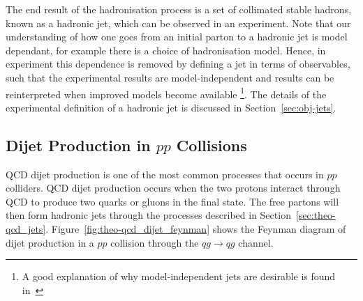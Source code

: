 The end result of the hadronisation process is a set of collimated stable hadrons,
known as a hadronic jet, which can be observed in an experiment.
Note that our understanding of how one goes from an initial parton to a hadronic jet is model dependant,
for example there is a choice of hadronisation model.
Hence, in experiment this dependence is removed by defining a jet in terms of observables,
such that the experimental results are model-independent and results can be reinterpreted when improved models become available
\footnote{A good explanation of why model-independent jets are desirable is found in~\cite{theo-jets_jb}}.
The details of the experimental definition of a hadronic jet is discussed in Section~\ref{sec:obj-jets}.


\subsection{Dijet Production in $pp$ Collisions}
\label{sec:theo-qcd_dijet}

QCD dijet production is one of the most common processes that occurs in $pp$ colliders.
QCD dijet production occurs when the two protons interact through QCD to produce two quarks or gluons in the final state.
The free partons will then form hadronic jets through the processes described in Section~\ref{sec:theo-qcd_jets}.
Figure~\ref{fig:theo-qcd_dijet_feynman} shows the Feynman diagram of
dijet production in a $pp$ collision through the $qg \to qg$ channel.

